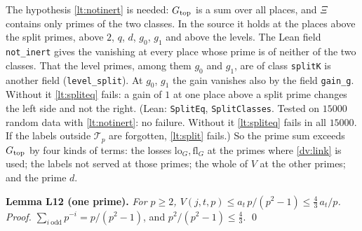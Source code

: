 \documentclass[11pt,letterpaper]{article}
\begin{document}
\noindent The hypothesis \eqref{lt:notinert} is needed: $G_{\rm top}$ is a sum over all places, and $\Xi$
contains only primes of the two classes. In the source it holds at the places above the split primes,
above $2$, $q$, $d$, $g_0$, $g_1$ and above the levels. The Lean field \texttt{not\_inert} gives the
vanishing at every place whose prime is of neither of the two classes. That the level primes, among them
$g_0$ and $g_1$, are of class \texttt{splitK} is another field (\texttt{level\_split}). At $g_0$, $g_1$ the
gain vanishes also by the field \texttt{gain\_g}. Without it
\eqref{lt:spliteq} fails: a gain of $1$ at one place above a split prime changes the left side and not
the right. (Lean: \texttt{SplitEq}, \texttt{SplitClasses}. Tested on $15000$ random data with
\eqref{lt:notinert}: no failure. Without it \eqref{lt:spliteq} fails in all $15000$. If the labels outside
$\mathcal T_p$ are forgotten, \eqref{lt:split} fails.) So the prime sum exceeds $G_{\rm top}$ by four kinds
of terms: the losses $\mathrm{lo}_G,\mathrm{fl}_G$ at the primes where \eqref{dv:link} is used; the labels
not served at those primes; the whole of $V$ at the other primes; and the prime $d$.

\textbf{Lemma L12 (one prime).} \emph{For $p\ge2$, $V(j,t,p)\le a_t\,p/(p^2-1)\le\frac43\,a_t/p$.}
\emph{Proof.} $\sum_{i\ \mathrm{odd}}p^{-i}=p/(p^2-1)$, and $p^2/(p^2-1)\le\frac43$. \qed
\end{document}

